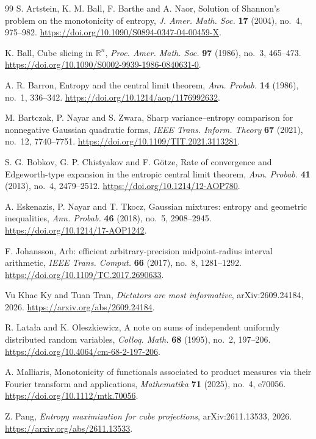 \documentclass[11pt,a4paper]{article}
\theoremstyle{remark}\newtheorem{remark}[theorem]{Remark}
\begin{document}
\begin{thebibliography}{99}
S. Artstein, K. M. Ball, F. Barthe and A. Naor,
Solution of Shannon's problem on the monotonicity of entropy,
\emph{J. Amer. Math. Soc.} \textbf{17} (2004), no.~4, 975--982.
\url{https://doi.org/10.1090/S0894-0347-04-00459-X}.


K. Ball, Cube slicing in $\mathbb R^n$,
\emph{Proc. Amer. Math. Soc.} \textbf{97} (1986), no.~3, 465--473.
\url{https://doi.org/10.1090/S0002-9939-1986-0840631-0}.


A. R. Barron, Entropy and the central limit theorem,
\emph{Ann. Probab.} \textbf{14} (1986), no.~1, 336--342.
\url{https://doi.org/10.1214/aop/1176992632}.


M. Bartczak, P. Nayar and S. Zwara,
Sharp variance--entropy comparison for nonnegative Gaussian quadratic forms,
\emph{IEEE Trans. Inform. Theory} \textbf{67} (2021), no.~12, 7740--7751.
\url{https://doi.org/10.1109/TIT.2021.3113281}.


S. G. Bobkov, G. P. Chistyakov and F. G\"otze,
Rate of convergence and Edgeworth-type expansion in the entropic central limit theorem,
\emph{Ann. Probab.} \textbf{41} (2013), no.~4, 2479--2512.
\url{https://doi.org/10.1214/12-AOP780}.

A. Eskenazis, P. Nayar and T. Tkocz,
Gaussian mixtures: entropy and geometric inequalities,
\emph{Ann. Probab.} \textbf{46} (2018), no.~5, 2908--2945.
\url{https://doi.org/10.1214/17-AOP1242}.


F. Johansson, Arb: efficient arbitrary-precision midpoint-radius interval arithmetic,
\emph{IEEE Trans. Comput.} \textbf{66} (2017), no.~8, 1281--1292.
\url{https://doi.org/10.1109/TC.2017.2690633}.


Vu Khac Ky and Tuan Tran, \emph{Dictators are most informative},
arXiv:2609.24184, 2026.
\url{https://arxiv.org/abs/2609.24184}.


R. Lata\l a and K. Oleszkiewicz,
A note on sums of independent uniformly distributed random variables,
\emph{Colloq. Math.} \textbf{68} (1995), no.~2, 197--206.
\url{https://doi.org/10.4064/cm-68-2-197-206}.


A. Malliaris, Monotonicity of functionals associated to product measures
via their Fourier transform and applications,
\emph{Mathematika} \textbf{71} (2025), no.~4, e70056.
\url{https://doi.org/10.1112/mtk.70056}.


Z. Pang, \emph{Entropy maximization for cube projections},
arXiv:2611.13533, 2026.
\url{https://arxiv.org/abs/2611.13533}.
\end{thebibliography}
\end{document}
